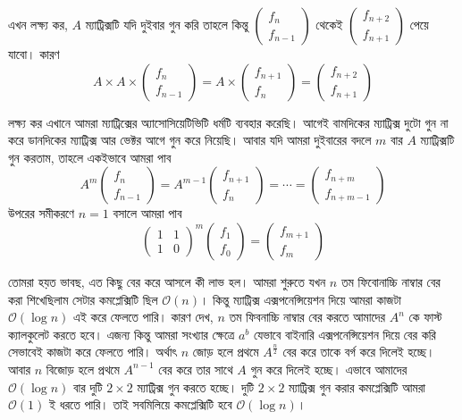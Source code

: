 \noindent এখন লক্ষ্য কর, $A$ ম্যাট্রিক্সটি যদি দুইবার গুন করি তাহলে কিন্তু $\begin{pmatrix}
  f_{n}\\
  f_{n - 1}
\end{pmatrix}$ থেকেই $\begin{pmatrix}
  f_{n + 2}\\
  f_{n + 1}
\end{pmatrix}$ পেয়ে যাবো।  কারণ
$$
A \times A \times
\begin{pmatrix}
f_{n} \\
f_{n - 1}
\end{pmatrix}
=
A \times
\begin{pmatrix}
f_{n + 1} \\
f_{n}
\end{pmatrix}
=
\begin{pmatrix}
f_{n + 2} \\
f_{n + 1}
\end{pmatrix}
$$

\noindent লক্ষ্য কর এখানে আমরা ম্যাট্রিক্সের অ্যাসোসিয়েটিভিটি ধর্মটি ব্যবহার করেছি। আগেই বামদিকের ম্যাট্রিক্স দুটো গুন না করে ডানদিকের ম্যাট্রিক্স আর ভেক্টর আগে গুন করে নিয়েছি। আবার যদি আমরা দুইবারের বদলে $m$ বার $A$ ম্যাট্রিক্সটি গুন করতাম, তাহলে  একইভাবে আমরা পাব
$$
A^m
\begin{pmatrix}
f_{n} \\
f_{n - 1}
\end{pmatrix}
=
A^{m-1}
\begin{pmatrix}
f_{n + 1} \\
f_{n}
\end{pmatrix}
= \cdots =
\begin{pmatrix}
f_{n + m} \\
f_{n + m - 1}
\end{pmatrix}
$$
\noindent উপরের সমীকরণে $n = 1$ বসালে আমরা পাব
$$
\begin{pmatrix}
1 & 1 \\
1 & 0
\end{pmatrix} ^ {m}
\begin{pmatrix}
f_{1} \\
f_{0}
\end{pmatrix}
=
\begin{pmatrix}
f_{m + 1} \\
f_{m}
\end{pmatrix}
$$

\noindent তোমরা হয়ত ভাবছ, এত কিছু বের করে আসলে কী লাভ হল। আমরা শুরুতে যখন $n$ তম ফিবোনাচ্চি নাম্বার বের করা শিখেছিলাম সেটার কমপ্লেক্সিটি ছিল $\mathcal{O}(n)$।  কিন্তু ম্যাট্রিক্স এক্সপনেন্সিয়েশন দিয়ে আমরা কাজটা $\mathcal{O}(\log{n})$ এই করে ফেলতে পারি। কারণ দেখ, $n$ তম ফিবনাচ্চি নাম্বার বের করতে আমাদের $A^{n}$ কে ফাস্ট ক্যালকুলেট করতে হবে। এজন্য কিন্তু আমরা সংখ্যার ক্ষেত্রে $a^b$ যেভাবে বাইনারি  এক্সপনেন্সিয়েশন দিয়ে বের করি সেভাবেই কাজটা করে ফেলতে পারি। অর্থাৎ $n$ জোড় হলে প্রথমে $A^{\frac{n}{2}}$ বের করে তাকে বর্গ করে দিলেই হচ্ছে। আবার $n$ বিজোড় হলে প্রথমে $A^{n - 1}$ বের করে তার সাথে $A$ গুন করে দিলেই হচ্ছে। এভাবে আমাদের $\mathcal{O}(\log{n})$ বার দুটি $2 \times 2$ ম্যাট্রিক্স গুন করতে হচ্ছে। দুটি $2 \times 2$ ম্যাট্রিক্স গুন করার কমপ্লেক্সিটি আমরা $\mathcal{O}(1)$ ই ধরতে পারি। তাই সবমিলিয়ে কমপ্লেক্সিটি হবে $\mathcal{O}(\log{n})$।


